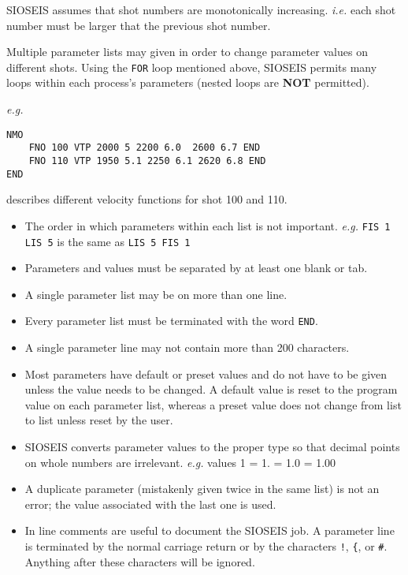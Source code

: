 SIOSEIS assumes that \gls{shot} numbers are monotonically increasing.
\textit{i.e.} each \gls{shot} number must be larger that the previous \gls{shot} number.

Multiple parameter lists may given in order to change parameter values on
different \glspl{shot}.  Using the \texttt{FOR} loop mentioned above, SIOSEIS permits
many loops within each process's parameters (nested loops are \textbf{NOT}
permitted).

\textit{e.g.}
\begin{verbatim}
NMO
    FNO 100 VTP 2000 5 2200 6.0  2600 6.7 END
    FNO 110 VTP 1950 5.1 2250 6.1 2620 6.8 END
END
\end{verbatim}
describes different velocity functions for \gls{shot} 100 and 110.

\begin{itemize}
\item The order in which parameters within each list is not important.
      \textit{e.g.} \texttt{FIS 1 LIS 5} is the same as \texttt{LIS 5 FIS 1}
\item Parameters and values must be separated by at least one blank or tab.
\item A single parameter list may be on more than one line.
\item Every parameter list must be terminated with the word \texttt{END}.
\item A single parameter line may not contain more than 200 characters.
\item Most parameters have default or preset values and do not have to be given
      unless the value needs to be changed.  A default value is reset to the
      program value on each parameter list, whereas a preset value does not
      change from list to list unless reset by the user.
\item SIOSEIS converts parameter values to the proper type so that decimal
      points on whole numbers are irrelevant.
      \textit{e.g.}   values 1 = 1. = 1.0 = 1.00
\item A duplicate parameter (mistakenly given twice in the same list) is not an
      error;  the value associated with the last one is used.
\item In line comments are useful to document the SIOSEIS job.  A parameter
      line is terminated by the normal carriage return or by the characters
      \texttt{!}, \texttt{\{}, or \texttt{\#}.  Anything after these
      characters will be ignored.
\end{itemize}


